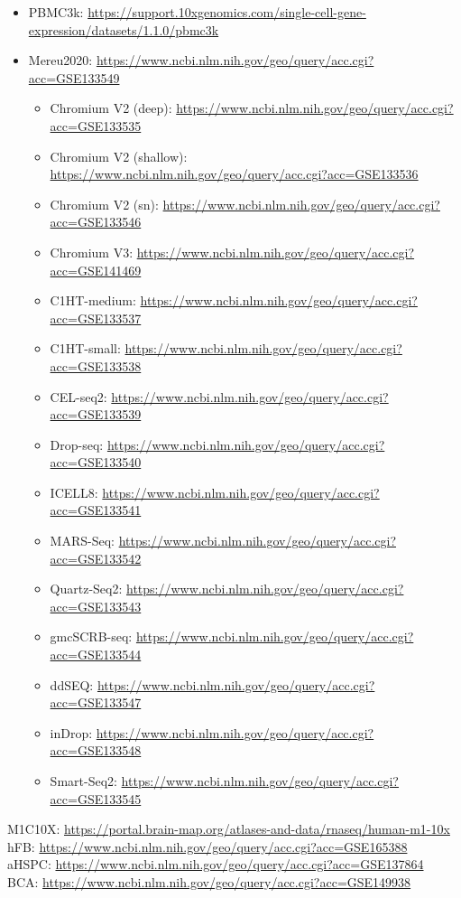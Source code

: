 \documentclass{article}
\begin{document}
\begin{itemize}
  \item PBMC3k: \url{https://support.10xgenomics.com/single-cell-gene-expression/datasets/1.1.0/pbmc3k}
  \item Mereu2020: \url{https://www.ncbi.nlm.nih.gov/geo/query/acc.cgi?acc=GSE133549}
  \begin{itemize}
    \item Chromium V2 (deep): \url{https://www.ncbi.nlm.nih.gov/geo/query/acc.cgi?acc=GSE133535}
    \item Chromium V2 (shallow): \url{https://www.ncbi.nlm.nih.gov/geo/query/acc.cgi?acc=GSE133536}
    \item Chromium V2 (sn): \url{https://www.ncbi.nlm.nih.gov/geo/query/acc.cgi?acc=GSE133546}
    \item Chromium V3: \url{https://www.ncbi.nlm.nih.gov/geo/query/acc.cgi?acc=GSE141469}
    \item C1HT-medium: \url{https://www.ncbi.nlm.nih.gov/geo/query/acc.cgi?acc=GSE133537}
    \item C1HT-small: \url{https://www.ncbi.nlm.nih.gov/geo/query/acc.cgi?acc=GSE133538}
    \item CEL-seq2: \url{https://www.ncbi.nlm.nih.gov/geo/query/acc.cgi?acc=GSE133539}
    \item Drop-seq: \url{https://www.ncbi.nlm.nih.gov/geo/query/acc.cgi?acc=GSE133540}
    \item ICELL8: \url{https://www.ncbi.nlm.nih.gov/geo/query/acc.cgi?acc=GSE133541}
    \item MARS-Seq: \url{https://www.ncbi.nlm.nih.gov/geo/query/acc.cgi?acc=GSE133542}
    \item Quartz-Seq2: \url{https://www.ncbi.nlm.nih.gov/geo/query/acc.cgi?acc=GSE133543}
    \item gmcSCRB-seq: \url{https://www.ncbi.nlm.nih.gov/geo/query/acc.cgi?acc=GSE133544}
    \item ddSEQ: \url{https://www.ncbi.nlm.nih.gov/geo/query/acc.cgi?acc=GSE133547}
    \item inDrop: \url{https://www.ncbi.nlm.nih.gov/geo/query/acc.cgi?acc=GSE133548}
    \item Smart-Seq2: \url{https://www.ncbi.nlm.nih.gov/geo/query/acc.cgi?acc=GSE133545}
  \end{itemize}
\end{itemize}
M1C10X: \url{https://portal.brain-map.org/atlases-and-data/rnaseq/human-m1-10x}\\
hFB: \url{https://www.ncbi.nlm.nih.gov/geo/query/acc.cgi?acc=GSE165388}\\
aHSPC: \url{https://www.ncbi.nlm.nih.gov/geo/query/acc.cgi?acc=GSE137864}\\
BCA: \url{https://www.ncbi.nlm.nih.gov/geo/query/acc.cgi?acc=GSE149938}\\
\cite{xie2021single}
\end{document}
